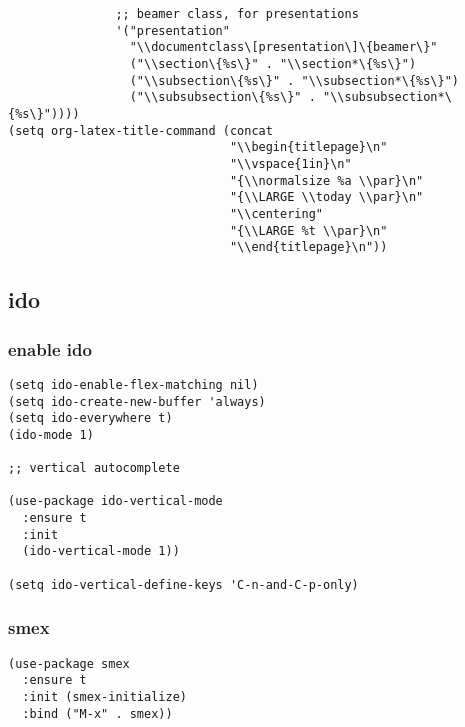 \documentclass[11pt]{article}
\begin{document}
\begin{verbatim}
               ;; beamer class, for presentations
               '("presentation"
                 "\\documentclass\[presentation\]\{beamer\}"
                 ("\\section\{%s\}" . "\\section*\{%s\}")
                 ("\\subsection\{%s\}" . "\\subsection*\{%s\}")
                 ("\\subsubsection\{%s\}" . "\\subsubsection*\{%s\}"))))
(setq org-latex-title-command (concat
                               "\\begin{titlepage}\n"
                               "\\vspace{1in}\n"
                               "{\\normalsize %a \\par}\n"
                               "{\\LARGE \\today \\par}\n"
                               "\\centering"
                               "{\\LARGE %t \\par}\n"
                               "\\end{titlepage}\n"))
\end{verbatim}
\subsection{ido}
\label{sec:org68fa30d}
\subsubsection{enable ido}
\label{sec:orgc30efde}
\begin{verbatim}
(setq ido-enable-flex-matching nil)
(setq ido-create-new-buffer 'always)
(setq ido-everywhere t)
(ido-mode 1)

;; vertical autocomplete

(use-package ido-vertical-mode
  :ensure t
  :init
  (ido-vertical-mode 1))

(setq ido-vertical-define-keys 'C-n-and-C-p-only)
\end{verbatim}
\subsubsection{smex}
\label{sec:orgfc25e80}
\begin{verbatim}
(use-package smex
  :ensure t
  :init (smex-initialize)
  :bind ("M-x" . smex))
\end{verbatim}
\end{document}
